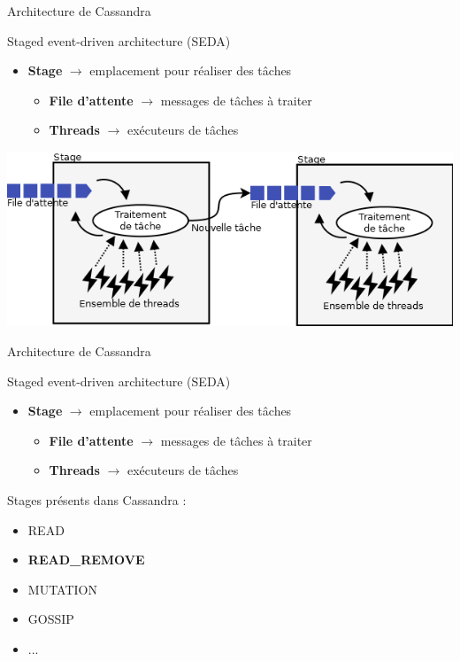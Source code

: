 \documentclass{beamer}
\begin{document}
\begin{frame}{Architecture de Cassandra}
\begin{block}{Staged event-driven architecture (SEDA)}
\begin{itemize}
    \item \textbf{Stage} $\rightarrow$ emplacement pour réaliser des tâches
    \begin{itemize}
	    \item \textbf{File d'attente} $\rightarrow$ messages de tâches à traiter
	    \item \textbf{Threads} $\rightarrow$ exécuteurs de tâches
    \end{itemize}
\end{itemize}
\end{block}
\centering
	\includegraphics[scale=0.42]{stages}
\end{frame}

\begin{frame}{Architecture de Cassandra}
\begin{block}{Staged event-driven architecture (SEDA)}
\begin{itemize}
    \item \textbf{Stage} $\rightarrow$ emplacement pour réaliser des tâches
    \begin{itemize}
	    \item \textbf{File d'attente} $\rightarrow$ messages de tâches à traiter
	    \item \textbf{Threads} $\rightarrow$ exécuteurs de tâches
    \end{itemize}
\end{itemize}
\end{block}
Stages présents dans Cassandra :
\begin{itemize}
	\item READ
	\item \textbf{READ\_REMOVE}
	\item MUTATION
	\item GOSSIP
	\item ...
\end{itemize}
\end{frame}
\end{document}

